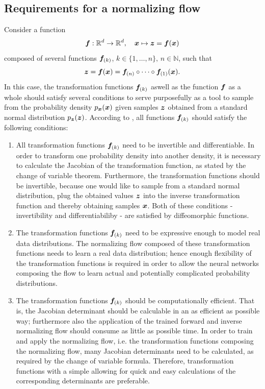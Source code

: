 \documentclass[a4paper,11pt]{report}
\def\lk#1{{\color{black}{#1}}}
\begin{document}
\subsection{Requirements for a normalizing flow}
Consider a function 
\begin{equation}
\bm{f}:\mathbb{R}^d \rightarrow \mathbb{R}^d, \quad \bm{x} \mapsto \bm{z} = \bm{f}(\bm{x})
\end{equation} composed of several functions $\bm{f}_{(k)}$, $k \in \{1,\dots,n\},\,n \in \mathbb{N}$, such that \begin{equation}
\bm{z} = \bm{f}(\bm{x}) = \bm{f}_{(n)} \circ \dots \circ \bm{f}_{(1)}(\bm{x}).
\end{equation} In this case, the transformation functions $\bm{f}_{(k)}$ aswell as the function $\bm{f}$ as a whole should satisfy several conditions to serve purposefully as a tool to sample from \lk{an approximation of} the probability density $p_{\bm{x}}(\bm{x})$ given samples $\bm{z}$ obtained from a standard normal distribution $p_{\bm{z}}(\bm{z})$. According to \cite{Kobyzev.2021}, all functions $\bm{f}_{(k)}$ should satisfy the following conditions:
\begin{enumerate}
\item All transformation functions $\bm{f}_{(k)}$ need to be invertible and differentiable. In order to transform one probability density into another density, it is necessary to calculate the Jacobian of the transformation function, as stated by the change of variable theorem. Furthermore, the transformation functions should be invertible, because one would like to sample from a standard normal distribution, plug the obtained values $\bm{z}$ into the inverse transformation function and thereby obtaining samples $\bm{x}$. Both of these conditions - invertibility and differentiabiliby - are satisfied by diffeomorphic functions.
\item The transformation functions $\bm{f}_{(k)}$ need to be expressive enough to model real data distributions. The normalizing flow composed of these transformation functions needs to learn a real data distribution; hence enough flexibility of the transformation functions is required in order to allow the neural networks composing the flow to learn actual and potentially complicated probability distributions.
\item The transformation functions $\bm{f}_{(k)}$ should be computationally efficient. That is, the Jacobian determinant should be calculable in an as efficient as possible way; furthermore also the application of the trained forward and inverse normalizing flow should consume as little as possible time. In order to train and apply the normalizing flow, i.e. the transformation functions composing the normalizing flow, many Jacobian determinants need to be calculated, as required by the change of variable formula. Therefore, transformation functions with a simple \lk{Jacobian} allowing for quick and easy calculations of the corresponding determinants are preferable.
\end{enumerate}
\end{document}
